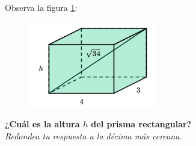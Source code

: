 Observa la figura \ref{fig:pitagoras3D_diag_05}:
\begin{figure}[H]
    \begin{center}
        \includegraphics[width=0.5\textwidth]{../images/pitagoras3D_diag_05.png}
    \end{center}
    \caption{}
    \label{fig:pitagoras3D_diag_05}
\end{figure}
\textbf{¿Cuál es la altura $h$ del prisma rectangular?}\\
\textit{Redondea tu respuesta a la décima más cercana.}